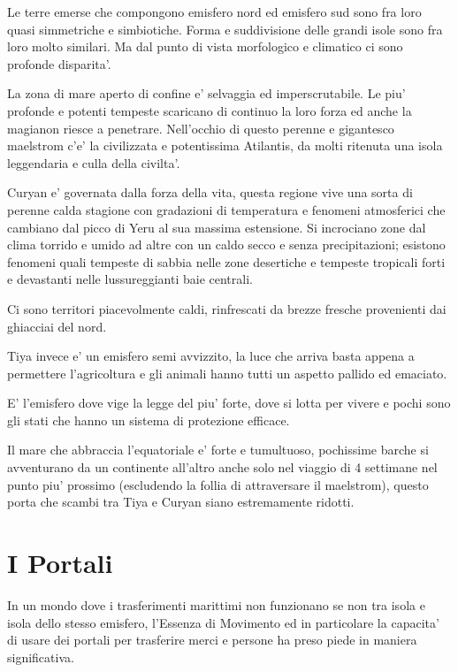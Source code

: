 \documentclass[a4paper,11pt,twoside,openany]{book}
\begin{document}
{Le terre emerse che compongono emisfero nord ed emisfero sud sono fra loro quasi simmetriche e simbiotiche. Forma e suddivisione delle grandi isole sono fra loro molto similari. Ma dal punto di vista morfologico e climatico ci sono profonde disparita'.

La zona di mare aperto di confine e' selvaggia ed imperscrutabile. Le piu' profonde e potenti tempeste scaricano di continuo la loro forza ed anche la magianon riesce a penetrare. Nell'occhio di questo perenne e gigantesco maelstrom c'e' la civilizzata e potentissima Atilantis, da molti ritenuta una isola leggendaria e culla della civilta'.

Curyan e' governata dalla forza della vita, questa regione vive una sorta di perenne calda stagione con gradazioni di temperatura e fenomeni atmosferici che cambiano dal picco di Yeru al sua massima estensione. Si incrociano zone dal clima torrido e umido ad altre con un caldo secco e senza precipitazioni; esistono fenomeni quali tempeste di sabbia nelle zone desertiche e tempeste tropicali forti e devastanti nelle lussureggianti baie centrali.

Ci sono territori piacevolmente caldi, rinfrescati da brezze fresche provenienti dai ghiacciai del nord.

Tiya invece e' un emisfero semi avvizzito, la luce che arriva basta appena a permettere l'agricoltura e gli animali hanno tutti un aspetto pallido ed emaciato.

E' l'emisfero dove vige la legge del piu' forte, dove si lotta per vivere e pochi sono gli stati che hanno un sistema di protezione efficace.

Il mare che abbraccia l'equatoriale e' forte e tumultuoso, pochissime barche si avventurano da un continente all'altro anche solo nel viaggio di 4 settimane nel punto piu' prossimo (escludendo la follia di attraversare il maelstrom), questo porta che scambi tra Tiya e Curyan siano estremamente ridotti.

\pagebreak

\section{I Portali}

\label{i-portali}

In un mondo dove i trasferimenti marittimi non funzionano se non tra isola e isola dello stesso emisfero, l'Essenza di Movimento ed in particolare la capacita' di usare dei portali per trasferire merci e persone ha preso piede in maniera significativa.

}
\end{document}
